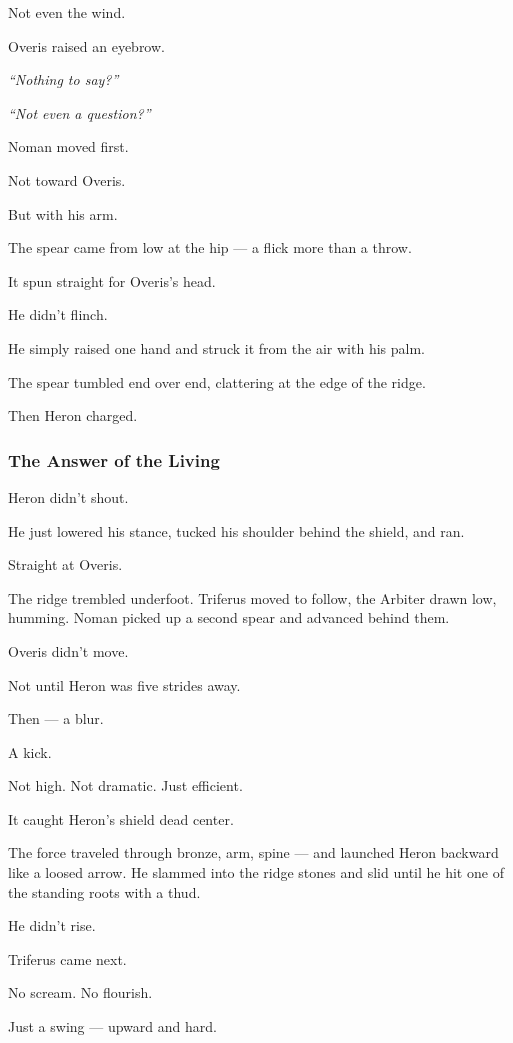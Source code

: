\documentclass[12pt]{article}
\begin{document}
Not even the wind.

Overis raised an eyebrow.

\textit{“Nothing to say?”}

\textit{“Not even a question?”}

Noman moved first.

Not toward Overis.

But with his arm.

The spear came from low at the hip — a flick more than a throw.

It spun straight for Overis’s head.

He didn’t flinch.

He simply raised one hand and struck it from the air with his palm.

The spear tumbled end over end, clattering at the edge of the ridge.

Then Heron charged.

\dotfill

\subsubsection{The Answer of the Living}

Heron didn’t shout.

He just lowered his stance, tucked his shoulder behind the shield, and ran.

Straight at Overis.

The ridge trembled underfoot. Triferus moved to follow, the Arbiter drawn low, humming. Noman picked up a second spear and advanced behind them.

Overis didn’t move.

Not until Heron was five strides away.

Then — a blur.

A kick.

Not high. Not dramatic. Just efficient.

It caught Heron’s shield dead center.

The force traveled through bronze, arm, spine — and launched Heron backward like a loosed arrow. He slammed into the ridge stones and slid until he hit one of the standing roots with a thud.

He didn’t rise.

\bigskip

Triferus came next.

No scream. No flourish.

Just a swing — upward and hard.
\end{document}

